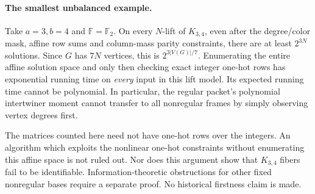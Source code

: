 \documentclass[11pt]{article}
\newcommand{\F}{\mathbb F}
\begin{document}
\paragraph{The smallest unbalanced example.}
Take $a=3,b=4$ and $\F=\F_2$. On every $N$-lift of $K_{3,4}$, even
after the degree/color mask, affine row sums and column-mass parity
constraints, there are at least $2^{3N}$ solutions. Since $G$ has
$7N$ vertices, this is $2^{3|V(G)|/7}$. Enumerating the entire affine
solution space and only then checking exact integer one-hot rows has
exponential running time on \emph{every} input in this lift model.
Its expected running time cannot be polynomial. In particular, the
regular packet's polynomial intertwiner moment cannot transfer to all
nonregular frames by simply observing vertex degrees first.

The matrices counted here need not have one-hot rows over the integers.
An algorithm which exploits the nonlinear one-hot constraints without
enumerating this affine space is not ruled out. Nor does this argument
show that $K_{3,4}$ fibers fail to be identifiable. Information-theoretic
obstructions for other fixed nonregular bases require a separate proof.
No historical firstness claim is made.
\end{document}
